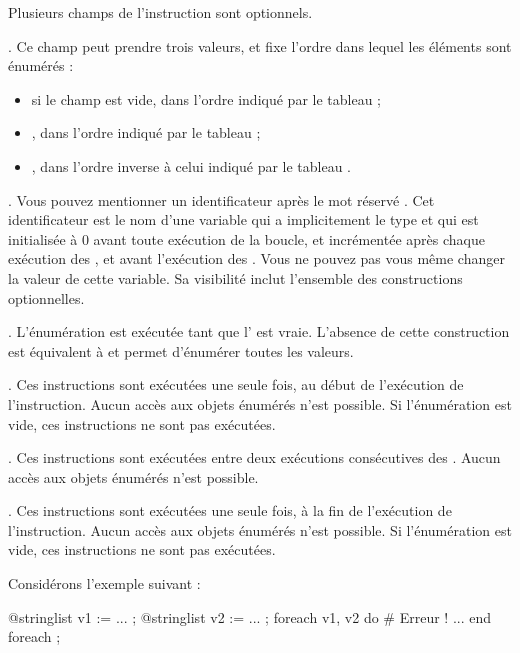 Plusieurs champs de l'instruction  sont optionnels.

. Ce champ peut prendre trois valeurs, et fixe l'ordre dans lequel les éléments sont énumérés :
\begin{itemize}
  \item si le champ est vide, dans l'ordre indiqué par le tableau  ;
  \item \galgas{<}, dans l'ordre indiqué par le tableau  ;
  \item \galgas{>}, dans l'ordre inverse à celui indiqué par le tableau .
\end{itemize}


. Vous pouvez mentionner un identificateur après le mot réservé . Cet identificateur est le nom d'une variable qui a implicitement le type  et qui est initialisée à 0 avant toute exécution de la boucle, et incrémentée après chaque exécution des , et avant l'exécution des . Vous ne pouvez pas vous même changer la valeur de cette variable. Sa visibilité inclut l'ensemble des constructions optionnelles.

. L'énumération est exécutée tant que l' est vraie. L'absence de cette construction est équivalent à  et permet d'énumérer toutes les valeurs.


. Ces instructions sont exécutées une seule fois, au début de l'exécution de l'instruction. Aucun accès aux objets énumérés n'est possible. Si l'énumération est vide, ces instructions ne sont pas exécutées.

. Ces instructions sont exécutées entre deux exécutions consécutives des . Aucun accès aux objets énumérés n'est possible.

. Ces instructions sont exécutées une seule fois, à la fin de l'exécution de l'instruction. Aucun accès aux objets énumérés n'est possible. Si l'énumération est vide, ces instructions ne sont pas exécutées.


Considérons l'exemple suivant :

\begin{galgascode}
@stringlist v1 := ... ;
@stringlist v2 := ... ;
foreach v1, v2 do # Erreur !
 ...
end foreach ;
\end{galgascode}

